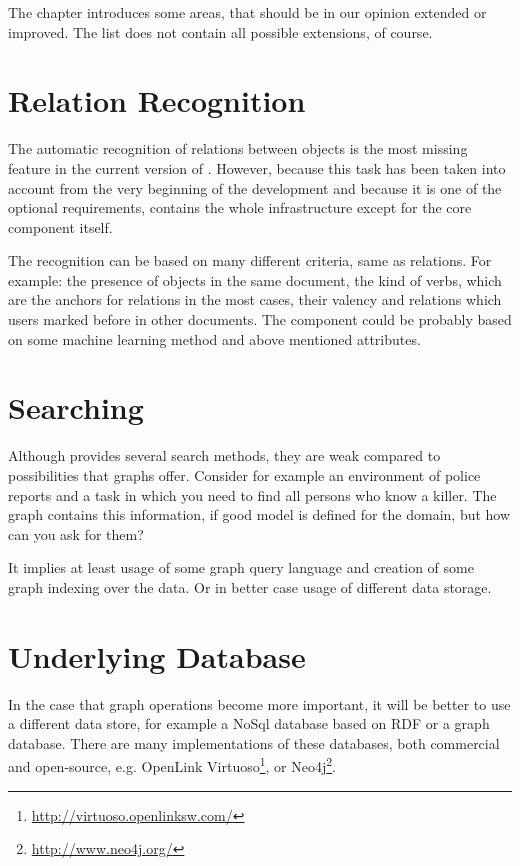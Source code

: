 
The chapter introduces some areas, that should be in our opinion extended or
improved. The list does not contain all possible extensions, of course.

\section{Relation Recognition}
The automatic recognition of relations between objects is the most missing
feature in the current version of \textan{}. However, because this task has been
taken into account from the very beginning of the development and because it is
one of the optional requirements, \textan{} contains the whole infrastructure
except for the core component itself.

The recognition can be based on many different criteria, same as relations.
For example: the presence of objects in the same document, the kind of verbs,
which are the anchors for relations in the most cases, their valency and
relations which users marked before in other documents. The component could be
probably based on some machine learning method and above mentioned attributes.

\section{Searching}
Although \textan{} provides several search methods, they are weak compared to
possibilities that graphs offer. Consider for example an environment of police
reports and a task in which you need to find all persons who know a killer. The
graph contains this information, if good model is defined for the domain, but
how can you ask for them?

It implies at least usage of some graph query language and creation of some
graph indexing over the data. Or in better case usage of different data storage. 

\section{Underlying Database}
In the case that graph operations become more important, it will be better to
use a different data store, for example a NoSql database based on RDF or a graph
database. There are many implementations of these databases, both commercial and
open-source, e.g. OpenLink Virtuoso\footnote{\url{http://virtuoso.openlinksw.com/}},
or Neo4j\footnote{\url{http://www.neo4j.org/}}.

